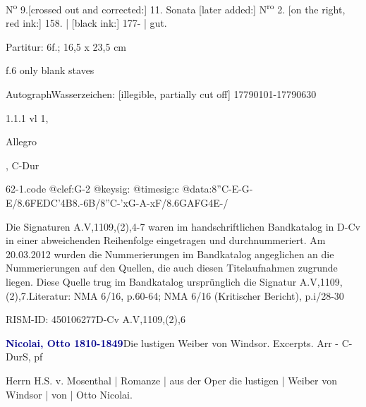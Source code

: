 \documentclass[a4paper, twocolumn, 11pt]{book}
\begin{document}
\par \begin{itshape} N\textsuperscript{o} 9.[crossed out and corrected:] 11. Sonata [later added:] N\textsuperscript{r}\textsuperscript{o} 2. [on the right, red ink:] 158. | [black ink:] 177- | gut.\end{itshape} 
\par \textcolor{darkblue}{}  Partitur: 6f.; 16,5 x 23,5 cm\newline \begin{small} f.6 only blank staves\end{small} \newline Autograph\newline Wasserzeichen: [illegible, partially cut off]  17790101-17790630
\par 1.1.1  vl 1, \begin{itshape}Allegro\end{itshape}, C-Dur  
\begin{filecontents*}{62-1.code}
@clef:G-2
@keysig:
@timesig:c
@data:8''C-E-G-E/8.6{FEDC}'4B8.-6B/8''C-'xG-A-xF/8.6{GAFG}4E-/
\end{filecontents*}
\newline %
\par Die Signaturen A.V,1109,(2),4-7 waren im handschriftlichen Bandkatalog in D-Cv in einer abweichenden Reihenfolge eingetragen und durchnummeriert. Am 20.03.2012 wurden die Nummerierungen im Bandkatalog angeglichen an die Nummerierungen auf den Quellen, die auch diesen Titelaufnahmen zugrunde liegen. Diese Quelle trug im Bandkatalog ursprünglich die Signatur A.V,1109,(2),7.\newline Literatur: NMA  6/16, p.60-64; NMA  6/16 (Kritischer Bericht), p.i/28-30
\par RISM-ID: 450106277\newline D-Cv  A.V,1109,(2),6
\par \vspace{16pt} \textcolor{darkblue}{\textbf{Nicolai, Otto  1810-1849}}\hfillplus{[63]}\newline Die lustigen Weiber von Windsor. Excerpts. Arr - C-Dur\newline S, pf
\par \begin{itshape} Herrn H.S. v. Mosenthal | Romanze | aus der Oper {\textquotedbl}die lustigen | Weiber von Windsor{\textquotedbl} | von | Otto Nicolai.\end{itshape} 
\end{document}
